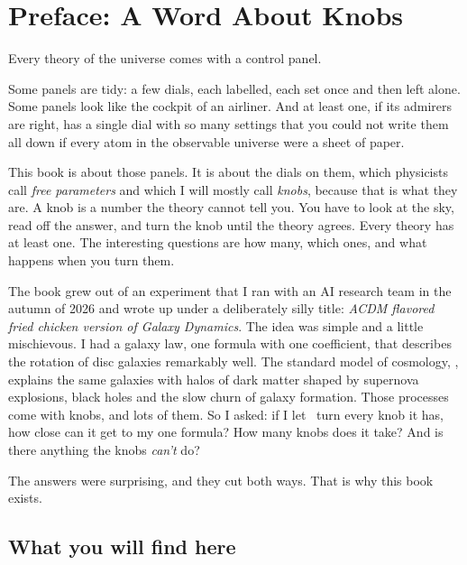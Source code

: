 \chapter*{Preface: A Word About Knobs}




Every theory of the universe comes with a control panel.

Some panels are tidy: a few dials, each labelled, each set once and then left alone. Some panels look like the cockpit of an airliner. And at least one, if its admirers are right, has a single dial with so many settings that you could not write them all down if every atom in the observable universe were a sheet of paper.

This book is about those panels. It is about the dials on them, which physicists call \emph{free parameters} and which I will mostly call \emph{knobs}, because that is what they are. A knob is a number the theory cannot tell you. You have to look at the sky, read off the answer, and turn the knob until the theory agrees. Every theory has at least one. The interesting questions are how many, which ones, and what happens when you turn them.

The book grew out of an experiment that I ran with an AI research team in the autumn of 2026 and wrote up under a deliberately silly title: \emph{ACDM flavored fried chicken version of Galaxy Dynamics}. The idea was simple and a little mischievous. I had a galaxy law, one formula with one coefficient, that describes the rotation of disc galaxies remarkably well. The standard model of cosmology, \LCDM, explains the same galaxies with halos of dark matter shaped by supernova explosions, black holes and the slow churn of galaxy formation. Those processes come with knobs, and lots of them. So I asked: if I let \LCDM\ turn every knob it has, how close can it get to my one formula? How many knobs does it take? And is there anything the knobs \emph{can't} do?

The answers were surprising, and they cut both ways. That is why this book exists.

\section*{What you will find here}


